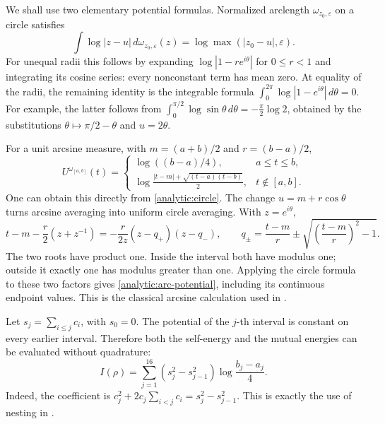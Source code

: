 We shall use two elementary potential formulas. Normalized arclength
\(\omega_{z_0,\varepsilon}\) on a circle satisfies
\begin{equation}\label{analytic:circle}
 \int\log|z-u|\,d\omega_{z_0,\varepsilon}(z)
       =\log\max(|z_0-u|,\varepsilon).
\end{equation}
For unequal radii this follows by expanding
\(\log|1-re^{i\theta}|\) for \(0\leq r<1\) and integrating its cosine
series: every nonconstant term has mean zero. At equality of the radii,
the remaining identity is the integrable formula
\(\int_0^{2\pi}\log|1-e^{i\theta}|\,d\theta=0\).
For example, the latter follows from
\(\int_0^{\pi/2}\log\sin\theta\,d\theta
=-\frac\pi2\log2\), obtained by the substitutions
\(\theta\mapsto\pi/2-\theta\) and \(u=2\theta\).

For a unit arcsine measure, with \(m=(a+b)/2\) and \(r=(b-a)/2\),
\begin{equation}\label{analytic:arc-potential}
 U^{\omega_{[a,b]}}(t)=
 \begin{cases}
 \log((b-a)/4),&a\leq t\leq b,\\[2mm]
 \displaystyle\log\frac{|t-m|+\sqrt{(t-a)(t-b)}}2,
     &t\notin[a,b].
 \end{cases}
\end{equation}
One can obtain this directly from \eqref{analytic:circle}. The change
\(u=m+r\cos\theta\) turns arcsine averaging into uniform circle
averaging. With \(z=e^{i\theta}\),
\[
 t-m-\frac r2(z+z^{-1})
   =-\frac r{2z}(z-q_+)(z-q_-),\qquad
 q_\pm=\frac{t-m}{r}\pm\sqrt{\left(\frac{t-m}{r}\right)^2-1}.
\]
The two roots have product one. Inside the interval both have modulus
one; outside it exactly one has modulus greater than one. Applying the
circle formula to these two factors gives
\eqref{analytic:arc-potential}, including its continuous endpoint values.
This is the classical arcsine calculation used in
\cite[(A.1)]{fauzan}.

Let \(s_j=\sum_{i\leq j}c_i\), with \(s_0=0\).
The potential of the \(j\)-th interval is constant on every earlier
interval. Therefore both the self-energy and the mutual energies can
be evaluated without quadrature:
\begin{equation}\label{analytic:energy}
 I(\rho)=\sum_{j=1}^{16}(s_j^2-s_{j-1}^2)
                       \log\frac{b_j-a_j}{4}.
\end{equation}
Indeed, the coefficient is
\(c_j^2+2c_j\sum_{i<j}c_i=s_j^2-s_{j-1}^2\).
This is exactly the use of nesting in \cite[(A.2)]{fauzan}.

